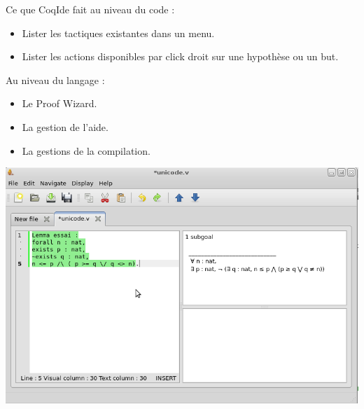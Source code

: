 \documentclass[slidetop]{beamer}
\begin{document}
\begin{frame}

Ce que CoqIde fait au niveau du code :

\begin{itemize}
    \item Lister les tactiques existantes dans un menu.
    \item Lister les actions disponibles par click droit sur une hypothèse ou un but.
\end{itemize}



\end{frame}


\begin{frame}

Au niveau du langage :

\begin{itemize}
    \item Le Proof Wizard.
    \item La gestion de l'aide.
    \item La gestions de la compilation.
\end{itemize}


\end{frame}



\begin{frame}
\includegraphics[width=1\textwidth]{unicode.png}
\end{frame}
\end{document}
